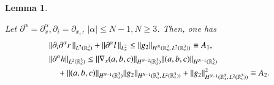\documentclass{amsart}[12pt, article]
\newtheorem{lemm}[theo]{Lemma}
\begin{document}
\begin{lemm} \label{rlh}

Let ${{\partial}}^\alpha={{\partial}}^\alpha_x  , {{\partial}}_i={{\partial}}_{x_i}$, $|\alpha|\le N-1, N\ge 3$. Then, one has
\begin{align}\label{Dr}
&\|{{\partial}}_i{{\partial}}^\alpha r\,\|_{L^2({{{\mathbb R}}}^3_x)}+\|{{\partial}}^\alpha   l\,\|_{L^2_{x}}
\le
\|g_2\|_{H^N({{{\mathbb R}}}^3_x,\, L^2({{{\mathbb R}}}^3_v))} \equiv A_1,
\\&\label{Dh}
\|{{\partial}}^\alpha   h\|_{L^2({{{\mathbb R}}}^3_x)}
\le \|\nabla_x (a,b,c)\|_{H^{N-2}({{{\mathbb R}}}^3_x)}\|(a,b,c)\|_{H^{N-1}({{{\mathbb R}}}^3_x)}
\\  &\quad+\|  (a,b,c)\|_{H^{N-1}({{{\mathbb R}}}^3_x)}\|g_2\|_{H^{N-1}({{{\mathbb R}}}^3_x,\, L^2({{{\mathbb R}}}^3_v))}
+
\|g_2\|_{H^{N-1}({{{\mathbb R}}}^3_x,\, L^2({{{\mathbb R}}}^3_v))}^2\equiv A_2. \notag
\end{align}
\end{lemm}
\noindent
\end{document}
